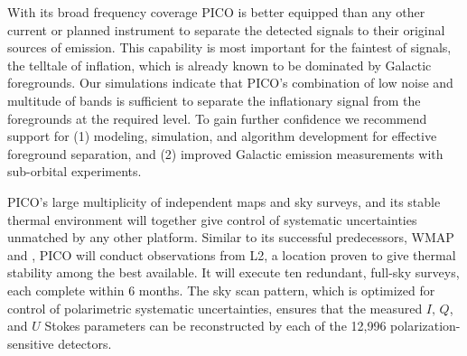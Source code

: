 \documentclass[PICOReport.tex]{subfiles}
\begin{document}
With its broad frequency coverage PICO is better equipped than any other current or planned instrument to separate the detected signals to their original sources of emission.  This capability is most important for the faintest of signals, the telltale of inflation, which is already known to be dominated by Galactic foregrounds. Our simulations indicate that PICO's combination of low noise and multitude of bands is sufficient to separate the inflationary signal from the foregrounds at the required level. To gain further confidence we recommend support for (1) modeling, simulation, and algorithm development for effective foreground separation, and (2) improved Galactic emission measurements with sub-orbital experiments. 


\afterpage{%
  \switchToLayoutPageB{}
    
   \clearpage
\switchToLayoutPageA{}
}


PICO's large multiplicity of independent maps and sky surveys, and its stable thermal environment will together give control of systematic uncertainties unmatched by any other platform. Similar to its successful predecessors, WMAP and \planck , PICO will conduct observations from L2, a location proven to give thermal stability among the best available.  It will execute ten redundant,  full-sky surveys, each complete within 6 months. The sky scan pattern, which is optimized for control of polarimetric systematic uncertainties, ensures that the measured $I,\, Q$, and $U$ Stokes parameters can be reconstructed by each of the 12,996 polarization-sensitive detectors. 
\end{document}
